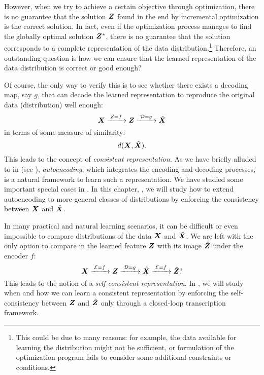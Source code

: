 \documentclass[../../book-main.tex]{subfiles}
\begin{document}
However, when we try to achieve a certain objective through
optimization, there is no guarantee that the solution $\bm{Z}$ found in
the end by incremental optimization is the correct solution. In fact, even if
the optimization process manages to find the globally optimal
solution $\bm{Z}^*$, there is no guarantee that the solution corresponds
to a complete representation of the data distribution.\footnote{This could be due to many reasons: for example, the data available for learning the distribution might not be sufficient, or formulation of the optimization program fails to consider some additional constraints or conditions.} Therefore, an outstanding question is how we can ensure that the learned representation of the data distribution is
correct or good enough? 

Of course, the only way to verify this is to see whether there exists a decoding map, say $g$, that can decode the learned representation to reproduce the original data (distribution) well enough:
\begin{equation}
  \bm{X}
  \xrightarrow{\hspace{1mm} \mathcal{E} = f \hspace{1mm}} \bm{Z}
  \xrightarrow{\hspace{1mm} \mathcal{D} = g \hspace{1mm}} \hat{\bm{X}}
\end{equation}
in terms of some measure of similarity:
\begin{equation}
  d(\bm{X}, \hat {\bm{X}}).
\end{equation}
This leads to the concept of {\em consistent representation}. As we have briefly alluded to in
 (see ), {\em autoencoding}, which integrates the
encoding and decoding processes, is a natural framework to learn such a representation. We have studied some important special cases in . In
this chapter, , we will study how to extend autoencoding to
more general classes of distributions by enforcing the consistency between $\bm{X}$ and $\hat {\bm{X}}$.

In many practical and natural learning scenarios, it can be difficult or even impossible to compare distributions of the data $\bm{X}$ and $\hat {\bm{X}}$. We are left with the only option to compare in the learned feature $\bm{Z}$ with its image $\hat {\bm{Z}}$ under the encoder $f$: 
\begin{equation}
 \bm{X}
\xrightarrow{\hspace{1mm} \mathcal{E} = f \hspace{1mm}} \bm{Z}  \xrightarrow{\hspace{1mm} \mathcal{D} = g \hspace{1mm}} \hat{\bm{X}} \xrightarrow{\hspace{1mm} \mathcal{E} = f \hspace{1mm}} \hat {\bm{Z}}?
\end{equation}
This leads to the notion of a {\em self-consistent representation}. In , we will study when and how we can learn a consistent representation by enforcing the self-consistency between $\bm{Z}$ and $\hat {\bm{Z}}$ only through a closed-loop transcription framework. 
\end{document}
